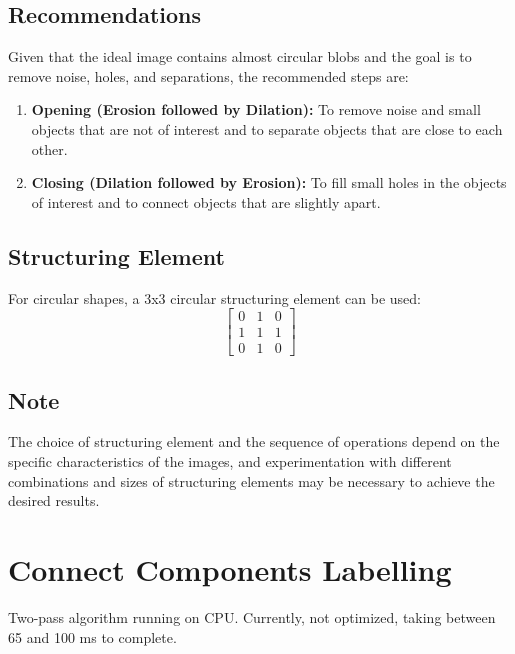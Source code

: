 \subsection{Recommendations}
Given that the ideal image contains almost circular blobs and the goal is to remove noise, holes, and separations, the recommended steps are:
\begin{enumerate}
      \item \textbf{Opening (Erosion followed by Dilation):} To remove noise and small objects that are not of interest and to separate objects that are close to each other.
      \item \textbf{Closing (Dilation followed by Erosion):} To fill small holes in the objects of interest and to connect objects that are slightly apart.
\end{enumerate}

\subsection{Structuring Element}
For circular shapes, a 3x3 circular structuring element can be used:
\[
      \begin{bmatrix}
            0 & 1 & 0 \\
            1 & 1 & 1 \\
            0 & 1 & 0
      \end{bmatrix}
\]

\subsection{Note}
The choice of structuring element and the sequence of operations depend on the specific characteristics of the images, and experimentation with different combinations and sizes of structuring elements may be necessary to achieve the desired results.



\section{Connect Components Labelling}

Two-pass algorithm running on CPU. Currently, not optimized, taking between 65 and 100 ms to complete.
